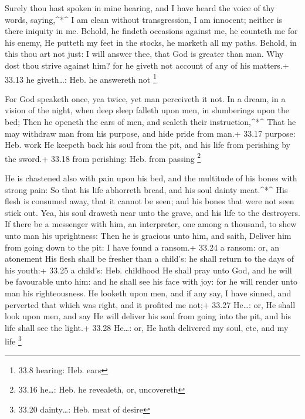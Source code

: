  Surely thou hast spoken in mine hearing, and I have heard
the voice of thy words, saying,\^{}*\^{}  I am clean without
transgression, I am innocent; neither is there iniquity in me.
 Behold, he findeth occasions against me, he counteth me
for his enemy,  He putteth my feet in the stocks, he
marketh all my paths.  Behold, in this thou art not just: I
will answer thee, that God is greater than man.  Why dost
thou strive against him? for he giveth not account of any of his
matters.+ 33.13 he giveth\ldots: Heb. he answereth not \footnote{33.8
  hearing: Heb. ears}

 For God speaketh once, yea twice, yet man perceiveth it
not.  In a dream, in a vision of the night, when deep sleep
falleth upon men, in slumberings upon the bed;  Then he
openeth the ears of men, and sealeth their instruction,\^{}*\^{}
 That he may withdraw man from his purpose, and hide pride
from man.+ 33.17 purpose: Heb. work  He keepeth back his
soul from the pit, and his life from perishing by the sword.+ 33.18 from
perishing: Heb. from passing \footnote{33.16 he\ldots: Heb. he
  revealeth, or, uncovereth}

 He is chastened also with pain upon his bed, and the
multitude of his bones with strong pain:  So that his life
abhorreth bread, and his soul dainty meat.\^{}*\^{}  His
flesh is consumed away, that it cannot be seen; and his bones that were
not seen stick out.  Yea, his soul draweth near unto the
grave, and his life to the destroyers.  If there be a
messenger with him, an interpreter, one among a thousand, to shew unto
man his uprightness:  Then he is gracious unto him, and
saith, Deliver him from going down to the pit: I have found a ransom.+
33.24 a ransom: or, an atonement  His flesh shall be
fresher than a child's: he shall return to the days of his youth:+ 33.25
a child's: Heb. childhood  He shall pray unto God, and he
will be favourable unto him: and he shall see his face with joy: for he
will render unto man his righteousness.  He looketh upon
men, and if any say, I have sinned, and perverted that which was right,
and it profited me not;+ 33.27 He\ldots: or, He shall look upon men, and
say  He will deliver his soul from going into the pit, and
his life shall see the light.+ 33.28 He\ldots: or, He hath delivered my
soul, etc, and my life \footnote{33.20 dainty\ldots: Heb. meat of desire}

